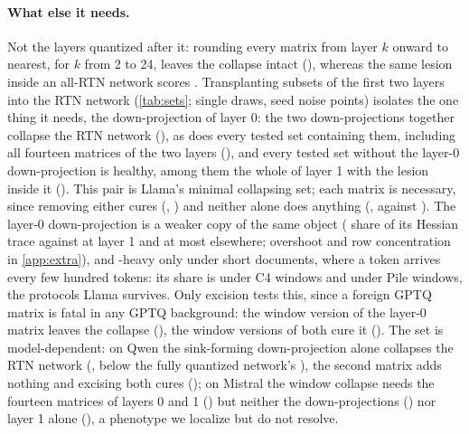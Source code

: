\paragraph{What else it needs.}
Not the layers quantized after it: rounding every matrix from layer $k$ onward to nearest, for $k$ from 2 to 24, leaves the collapse intact (\RtnTailRange{}), whereas the same lesion inside an all-RTN network scores \TPrtn{}.
Transplanting subsets of the first two layers into the RTN network (\cref{tab:sets}; single draws, seed noise \SeedNoise{} points) isolates the one thing it needs, the down-projection of layer 0: the two down-projections together collapse the RTN network (\TwoDownIF{}), as does every tested set containing them, including all fourteen matrices of the two layers (\LfourteenIF{}), and every tested set without the layer-0 down-projection is healthy, among them the whole of layer 1 with the lesion inside it (\LoneWholeIF{}).
This pair is Llama's minimal collapsing set; each matrix is necessary, since removing either cures (\LrtnZeroDownIF{}, \LoneMatrixIF{}) and neither alone does anything (\LzeroAloneIF{}, \LoneAloneIF{} against \LrtnIF{}).
The layer-0 down-projection is a weaker copy of the same object (\bos{} share of its Hessian trace \AbosZero{} against \AbosOne{} at layer 1 and at most \AbosRest{} elsewhere; overshoot and row concentration in \cref{app:extra}), and \bos{}-heavy only under short documents, where a \bos{} token arrives every few hundred tokens: its share is \AbosZeroWin{} under C4 windows and \AbosZeroPile{} under Pile windows, the protocols Llama survives.
Only excision tests this, since a foreign GPTQ matrix is fatal in any GPTQ background: the window version of the layer-0 matrix leaves the collapse (\LcwinZeroSwapIF{}), the window versions of both cure it (\LcwinPairSwapIF{}).
The set is model-dependent: on Qwen the sink-forming down-projection alone collapses the RTN network (\QlesionRtnIF{}, below the fully quantized network's \QgptqIF{}), the second matrix adds nothing and excising both cures (\QtwoMatrixIF{}); on Mistral the window collapse needs the fourteen matrices of layers 0 and 1 (\MfourteenIF{}) but neither the down-projections (\MfourDownIF{}) nor layer 1 alone (\MlayerOneIF{}), a phenotype we localize but do not resolve.
